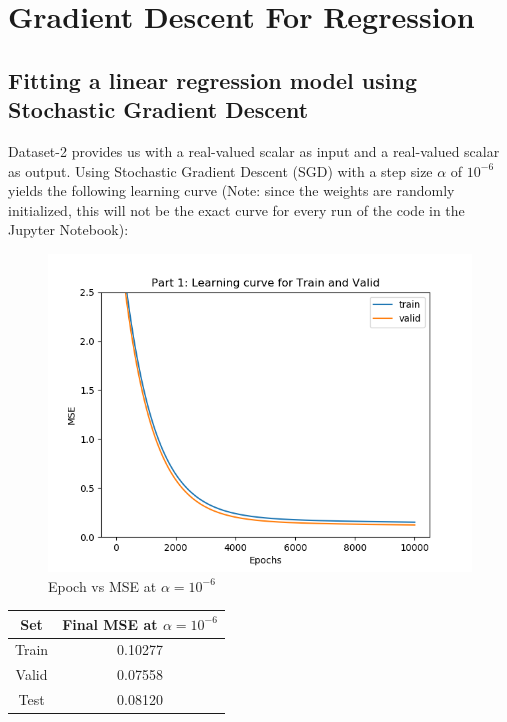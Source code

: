\documentclass[paper=a4, fontsize=11pt]{scrartcl} %
\numberwithin{equation}{section} %
\numberwithin{figure}{section} %
\numberwithin{table}{section} %
\begin{document}

\section{Gradient Descent For Regression}
\subsection{Fitting a linear regression model using Stochastic Gradient Descent}

Dataset-2 provides us with a real-valued scalar as input and a real-valued scalar as output. Using Stochastic Gradient Descent (SGD) with a step size \(\alpha\) of \(10^{-6}\) yields the following learning curve (Note: since the weights are randomly initialized, this will not be the exact curve for every run of the code in the Jupyter Notebook):

\begin{figure}[H]
    \includegraphics[width=\linewidth]{q2p1.png}
    \caption{Epoch vs MSE at \(\alpha=10^{-6}\)}
    \label{fig:q2p1}
\end{figure}
\begin{center}
\begin{tabular}{ |c|c| }
	\hline
	\textbf{Set} & \textbf{Final MSE at \(\alpha = 10^{-6}\)} \\
	\hline
    Train & 0.10277 \\
	Valid & 0.07558 \\
	Test & 0.08120 \\
	\hline
\end{tabular}
\end{center}
\end{document}
